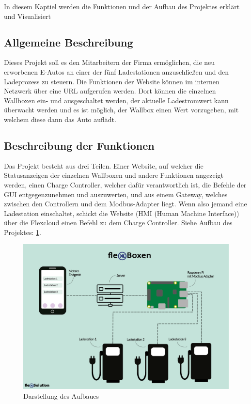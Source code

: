 In diesem Kaptiel werden die Funktionen und der Aufbau des Projektes erklärt und Visualisiert


\subsection{Allgemeine  Beschreibung}

Dieses Projekt soll es den Mitarbeitern der Firma ermöglichen, die neu erworbenen E-Autos an einer der fünf Ladestationen anzuschließen und den Ladeprozess zu steuern. Die Funktionen der Website können im internen Netzwerk über eine URL aufgerufen werden. Dort können die einzelnen Wallboxen ein- und ausgeschaltet werden, der aktuelle Ladestromwert kann überwacht werden und es ist möglich, der Wallbox einen Wert vorzugeben, mit welchem diese dann das Auto auflädt.

\subsection{Beschreibung der Funktionen}  \label{AufbauDesProjektesWallbox}
Das Projekt besteht aus drei Teilen. Einer Website, auf welcher die Statusanzeigen der einzelnen Wallboxen und andere Funktionen angezeigt werden, einen Charge Controller, welcher dafür verantwortlich ist, die Befehle der GUI entgegenzunehmen und auszuwerten, und aus einem Gateway, welches zwischen den Controllern und dem Modbus-Adapter liegt. Wenn also jemand eine Ladestation einschaltet, schickt die Website (HMI (Human Machine Interface)) über die Flexcloud einen Befehl zu dem Charge Controller.
Siehe Aufbau des Projektes: \ref{fig:impl:Infografik_FlexBoxen}.

\begin{figure}[h t]
  \centering
  \includegraphics[scale=0.7]{pics/Infografik_FlexBoxen.png}
  \caption{Darstellung des Aufbaues}
  \label{fig:impl:Infografik_FlexBoxen}
\end{figure}

